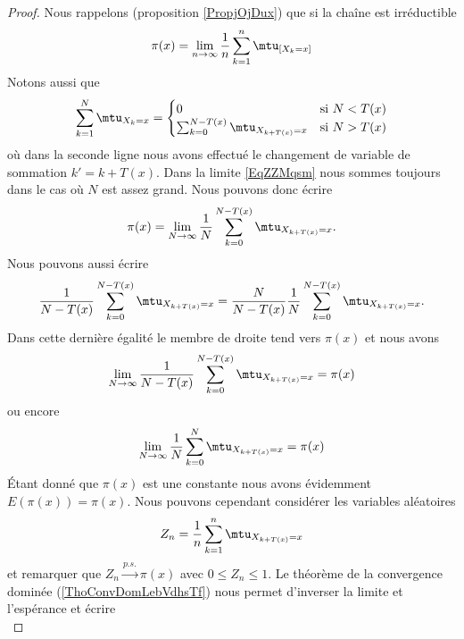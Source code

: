 \begin{proof}
    Nous rappelons (proposition \ref{PropjOjDux}) que si la chaîne est irréductible
    \begin{equation}        \label{EqZZMqsm}
        \pi(x)=\lim_{n\to \infty} \frac{1}{ n }\sum_{k=1}^n\mtu_{[X_k=x]}       
    \end{equation}
    Notons aussi que
    \begin{equation}
        \sum_{k=1}^N\mtu_{X_k=x}=\begin{cases}
            0    &   \text{si \( N<T(x)\)}\\
            \sum_{k=0}^{N-T(x)}\mtu_{X_{k+T(x)}=x}    &    \text{si \( N>T(x)\)}
        \end{cases}
    \end{equation}
    où dans la seconde ligne nous avons effectué le changement de variable de sommation \( k'=k+T(x)\). Dans la limite \eqref{EqZZMqsm} nous sommes toujours dans le cas où \( N\) est assez grand. Nous pouvons donc écrire
    \begin{equation}
        \pi(x)=\lim_{N\to \infty} \frac{1}{ N }\sum_{k=0}^{N-T(x)}\mtu_{X_{k+T(x)}=x}.
    \end{equation}
    Nous pouvons aussi écrire
    \begin{equation}
        \frac{1}{ N-T(x) } \sum_{k=0}^{N-T(x)}\mtu_{X_{k+T(x)}=x}=\frac{ N }{ N-T(x) }\frac{1}{ N } \sum_{k=0}^{N-T(x)}\mtu_{X_{k+T(x)}=x}.
    \end{equation}
    Dans cette dernière égalité le membre de droite tend vers \( \pi(x)\) et nous avons
    \begin{equation}
        \lim_{N\to \infty} \frac{1}{ N-T(x) } \sum_{k=0}^{N-T(x)}\mtu_{X_{k+T(x)}=x}=\pi(x)
    \end{equation}
    ou encore
    \begin{equation}
        \lim_{N\to \infty} \frac{1}{ N} \sum_{k=0}^{N}\mtu_{X_{k+T(x)}=x}=\pi(x)
    \end{equation}
    Étant donné que $\pi(x)$ est une constante nous avons évidemment $E(\pi(x))=\pi(x)$. Nous pouvons cependant considérer les variables aléatoires
    \begin{equation}
        Z_n=\frac{1}{ n }\sum_{k=1}^n\mtu_{X_{k+T(x)}=x}
    \end{equation}
    et remarquer que $Z_n\stackrel{p.s.}{\longrightarrow} \pi(x)$ avec $0\leq Z_n\leq 1$. Le théorème de la convergence dominée (\ref{ThoConvDomLebVdhsTf}) nous permet d'inverser la limite et l'espérance et écrire
    \begin{subequations}

\end{subequations}
\end{proof}
